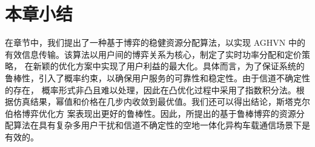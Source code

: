 \section{本章小结}\label{section2-5}
在章节中，我们提出了一种基于博弈的稳健资源分配算法，以实现 AGHVN 中的有效信息传输。该算法以用户间的博弈关系为核心，制定了实时功率分配和定价策略，
在新颖的优化方案中实现了用户利益的最大化。具体而言，为了保证系统的鲁棒性，引入了概率约束，以确保用户服务的可靠性和稳定性。由于信道不确定性的存在，
概率形式非凸且难以处理，因此在凸优化过程中采用了指数积分法。根据仿真结果，幂值和价格在几步内收敛到最优值。我们还可以得出结论，斯塔克尔伯格博弈优化方
案表现出更好的鲁棒性。因此，所提出的基于鲁棒博弈的资源分配算法在具有复杂多用户干扰和信道不确定性的空地一体化异构车载通信场景下是有效的。

